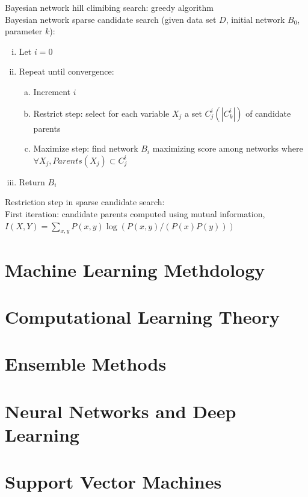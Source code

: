 \documentclass{article}
\begin{document}
			Bayesian network hill climibing search: greedy algorithm \\
			Bayesian network sparse candidate search (given data set $D$, initial network $B_0$, parameter $k$):
			\begin{enumerate}[(i)]
				\item Let $i = 0$
				\item Repeat until convergence:
				\begin{enumerate}[(a)]
					\item Increment $i$
					\item Restrict step: select for each variable $X_j$ a set $C_j^i(|C_k^i|)$ of candidate parents
					\item Maximize step: find network $B_i$ maximizing score among networks where $\forall X_j, Parents(X_j) \subset C_j^i$
					\end{enumerate}
				\item Return $B_i$
				\end{enumerate}
			Restriction step in sparse candidate search: \\
			First iteration: candidate parents computed using mutual information, $I(X, Y) = \sum_{x, y} P(x, y)\log{(P(x, y)/(P(x)P(y)))}$ 
			

		\clearpage

	\section{Machine Learning Methdology}
		\clearpage

	\section{Computational Learning Theory}
		\clearpage

	\section{Ensemble Methods}
		\clearpage

	\section{Neural Networks and Deep Learning}
		\clearpage

	\section{Support Vector Machines}
		\clearpage
\end{document}
